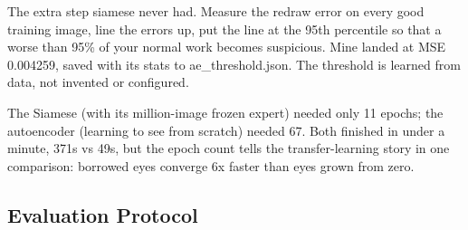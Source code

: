 \documentclass[conference]{IEEEtran}
\begin{document}
The extra step siamese never had. Measure the redraw error on every good training image, line the errors up, put the line at the 95th percentile so that a worse than 95\% of your normal work becomes suspicious. Mine landed at MSE 0.004259, saved with its stats to ae\_threshold.json. The threshold is learned from data, not invented or configured.

The Siamese (with its million-image frozen expert) needed only 11 epochs; the autoencoder (learning to see from scratch) needed 67. Both finished in under a minute, 371s vs 49s, but the epoch count tells the transfer-learning story in one comparison: borrowed eyes converge 6x faster than eyes grown from zero.

\subsection{Evaluation Protocol}
\end{document}
